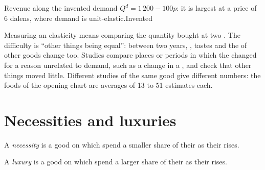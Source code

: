 \begin{omchart}{Revenue along the invented demand $Q^d = 1\,200 - 100p$: it is largest at a price of 6
dalens, where demand is unit-elastic.}{Invented}
\end{omchart}

\begin{measure}
Measuring an elasticity means comparing the quantity bought at two . The difficulty is ``other
things being equal'': between two years, , tastes and the  of other goods change too. Studies
compare places or periods in which the  changed for a reason unrelated to demand, such as a change
in a , and check that other things moved little. Different studies of the same good give different
numbers: the foods of the opening chart are averages of 13 to 51 estimates each.
\end{measure}

\section{Necessities and luxuries}

\begin{definition}[Necessity]\label{def:g9:elasticity-first-look:necessity}
A \emph{necessity} is a good on which  spend a smaller share of their 
as their  rises.
\end{definition}

\begin{definition}[Luxury]\label{def:g9:elasticity-first-look:luxury}
A \emph{luxury} is a good on which  spend a larger share of their  as their
 rises.
\end{definition}

